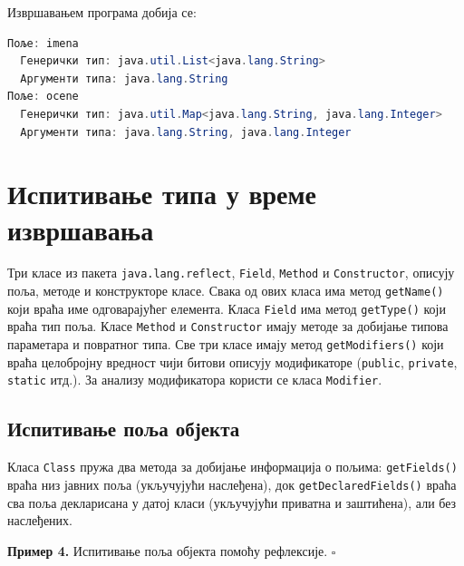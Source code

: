 Извршавањем програма добија се:

\begin{lstlisting}[language=Java]
Поље: imena
  Генерички тип: java.util.List<java.lang.String>
  Аргументи типа: java.lang.String
Поље: ocene
  Генерички тип: java.util.Map<java.lang.String, java.lang.Integer>
  Аргументи типа: java.lang.String, java.lang.Integer
\end{lstlisting}

\section{Испитивање типа у време извршавања}

Три класе из пакета \texttt{java.lang.reflect}, \texttt{Field}, \texttt{Method} и \texttt{Constructor}, описују поља, методе и конструкторе класе. Свака од ових класа има метод \texttt{getName()} који враћа име одговарајућег елемента. Класа \texttt{Field} има метод \texttt{getType()} који враћа тип поља. Класе \texttt{Method} и \texttt{Constructor} имају методе за добијање типова параметара и повратног типа. Све три класе имају метод \texttt{getModifiers()} који враћа целобројну вредност чији битови описују модификаторе (\texttt{public}, \texttt{private}, \texttt{static} итд.). За анализу модификатора користи се класа \texttt{Modifier}.

\subsection{Испитивање поља објекта}

Класа \texttt{Class} пружа два метода за добијање информација о пољима: \texttt{getFields()} враћа низ јавних поља (укључујући наслеђена), док \texttt{getDeclaredFields()} враћа сва поља декларисана у датој класи (укључујући приватна и заштићена), али без наслеђених.


\bigskip

\noindent \textbf{Пример 4.} Испитивање поља објекта помоћу рефлексије. $\square$

\medskip

